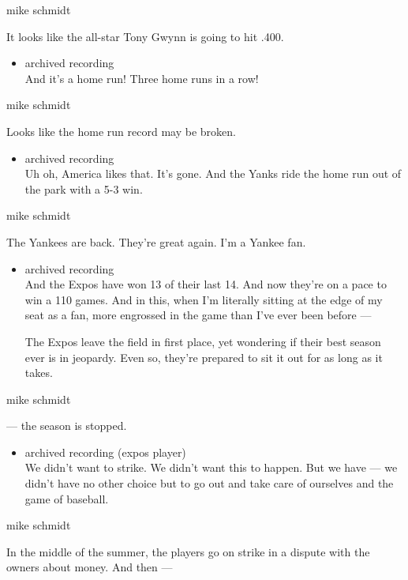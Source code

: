 mike schmidt

It looks like the all-star Tony Gwynn is going to hit .400.

\begin{itemize}
\tightlist
\item
  archived recording\\
  And it's a home run! Three home runs in a row!
\end{itemize}

mike schmidt

Looks like the home run record may be broken.

\begin{itemize}
\tightlist
\item
  archived recording\\
  Uh oh, America likes that. It's gone. And the Yanks ride the home run
  out of the park with a 5-3 win.
\end{itemize}

mike schmidt

The Yankees are back. They're great again. I'm a Yankee fan.

\begin{itemize}
\item
  archived recording\\
  And the Expos have won 13 of their last 14. And now they're on a pace
  to win a 110 games. And in this, when I'm literally sitting at the
  edge of my seat as a fan, more engrossed in the game than I've ever
  been before ---

  The Expos leave the field in first place, yet wondering if their best
  season ever is in jeopardy. Even so, they're prepared to sit it out
  for as long as it takes.
\end{itemize}

mike schmidt

--- the season is stopped.

\begin{itemize}
\tightlist
\item
  archived recording (expos player)\\
  We didn't want to strike. We didn't want this to happen. But we have
  --- we didn't have no other choice but to go out and take care of
  ourselves and the game of baseball.
\end{itemize}

mike schmidt

In the middle of the summer, the players go on strike in a dispute with
the owners about money. And then ---

